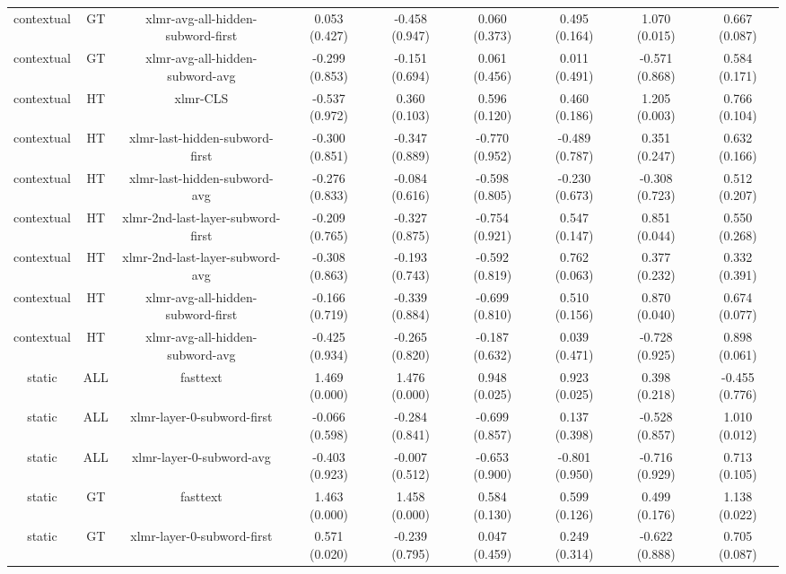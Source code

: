 \begin{sidewaystable}[htb]
\begin{tabular}{@{}ccccccccc@{}}
        contextual & GT & xlmr-avg-all-hidden-subword-first & 0.053 (0.427) & -0.458 (0.947) & 0.060 (0.373) & 0.495 (0.164) & 1.070 (0.015) & 0.667 (0.087) \\
        contextual & GT & xlmr-avg-all-hidden-subword-avg & -0.299 (0.853) & -0.151 (0.694) & 0.061 (0.456) & 0.011 (0.491) & -0.571 (0.868) & 0.584 (0.171) \\
        contextual & HT & xlmr-CLS & -0.537 (0.972) & 0.360 (0.103) & 0.596 (0.120) & 0.460 (0.186) & 1.205 (0.003) & 0.766 (0.104) \\
        contextual & HT & xlmr-last-hidden-subword-first & -0.300 (0.851) & -0.347 (0.889) & -0.770 (0.952) & -0.489 (0.787) & 0.351 (0.247) & 0.632 (0.166) \\
        contextual & HT & xlmr-last-hidden-subword-avg & -0.276 (0.833) & -0.084 (0.616) & -0.598 (0.805) & -0.230 (0.673) & -0.308 (0.723) & 0.512 (0.207) \\
        contextual & HT & xlmr-2nd-last-layer-subword-first & -0.209 (0.765) & -0.327 (0.875) & -0.754 (0.921) & 0.547 (0.147) & 0.851 (0.044) & 0.550 (0.268) \\
        contextual & HT & xlmr-2nd-last-layer-subword-avg & -0.308 (0.863) & -0.193 (0.743) & -0.592 (0.819) & 0.762 (0.063) & 0.377 (0.232) & 0.332 (0.391) \\
        contextual & HT & xlmr-avg-all-hidden-subword-first & -0.166 (0.719) & -0.339 (0.884) & -0.699 (0.810) & 0.510 (0.156) & 0.870 (0.040) & 0.674 (0.077) \\
        contextual & HT & xlmr-avg-all-hidden-subword-avg & -0.425 (0.934) & -0.265 (0.820) & -0.187 (0.632) & 0.039 (0.471) & -0.728 (0.925) & 0.898 (0.061) \\
        static & ALL & fasttext & 1.469 (0.000) & 1.476 (0.000) & 0.948 (0.025) & 0.923 (0.025) & 0.398 (0.218) & -0.455 (0.776) \\
        static & ALL & xlmr-layer-0-subword-first & -0.066 (0.598) & -0.284 (0.841) & -0.699 (0.857) & 0.137 (0.398) & -0.528 (0.857) & 1.010 (0.012) \\
        static & ALL & xlmr-layer-0-subword-avg & -0.403 (0.923) & -0.007 (0.512) & -0.653 (0.900) & -0.801 (0.950) & -0.716 (0.929) & 0.713 (0.105) \\
        static & GT & fasttext & 1.463 (0.000) & 1.458 (0.000) & 0.584 (0.130) & 0.599 (0.126) & 0.499 (0.176) & 1.138 (0.022) \\
        static & GT & xlmr-layer-0-subword-first & 0.571 (0.020) & -0.239 (0.795) & 0.047 (0.459) & 0.249 (0.314) & -0.622 (0.888) & 0.705 (0.087) \\

\end{tabular}
\end{sidewaystable}
